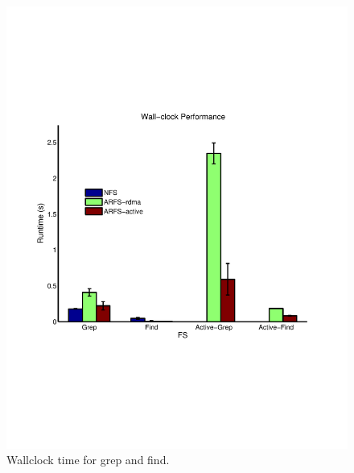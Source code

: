 \documentclass[10pt]{article}
\begin{document}
\begin{figure}
  \centering
\includegraphics[scale=0.5, trim = 0 200 0 200]{../../results/matlab/wallclock2.pdf}
  \caption{Wallclock time for grep and find.}\label{wallclock2}
\end{figure}
\end{document}
